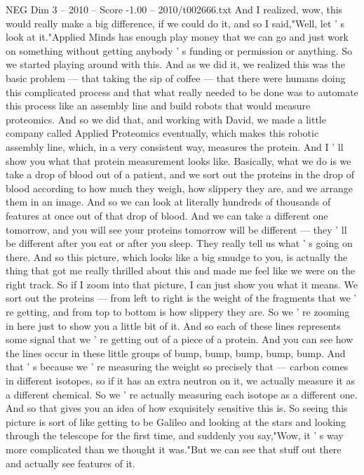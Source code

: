 \begin{textsample}{NEG Dim 3 – 2010 – Score -1.00 – 2010/t002666.txt}
And I realized, wow, this would really make a big difference, if we could do it, and so I said,"Well, let ' s look at it."Applied Minds has enough play money that we can go and just work on something without getting anybody ' s funding or permission or anything.
So we started playing around with this.
And as we did it, we realized this was the basic problem — that taking the sip of coffee — that there were humans doing this complicated process and that what really needed to be done was to automate this process like an assembly line and build robots that would measure proteomics.
And so we did that, and working with David, we made a little company called Applied Proteomics eventually, which makes this robotic assembly line, which, in a very consistent way, measures the protein.
And I ' ll show you what that protein measurement looks like.
Basically, what we do is we take a drop of blood out of a patient, and we sort out the proteins in the drop of blood according to how much they weigh, how slippery they are, and we arrange them in an image.
And so we can look at literally hundreds of thousands of features at once out of that drop of blood.
And we can take a different one tomorrow, and you will see your proteins tomorrow will be different — they ' ll be different after you eat or after you sleep.
They really tell us what ' s going on there.
And so this picture, which looks like a big smudge to you, is actually the thing that got me really thrilled about this and made me feel like we were on the right track.
So if I zoom into that picture, I can just show you what it means.
We sort out the proteins — from left to right is the weight of the fragments that we ' re getting, and from top to bottom is how slippery they are.
So we ' re zooming in here just to show you a little bit of it.
And so each of these lines represents some signal that we ' re getting out of a piece of a protein.
And you can see how the lines occur in these little groups of bump, bump, bump, bump, bump.
And that ' s because we ' re measuring the weight so precisely that — carbon comes in different isotopes, so if it has an extra neutron on it, we actually measure it as a different chemical.
So we ' re actually measuring each isotope as a different one.
And so that gives you an idea of how exquisitely sensitive this is.
So seeing this picture is sort of like getting to be Galileo and looking at the stars and looking through the telescope for the first time, and suddenly you say,"Wow, it ' s way more complicated than we thought it was."But we can see that stuff out there and actually see features of it.

\end{textsample}
